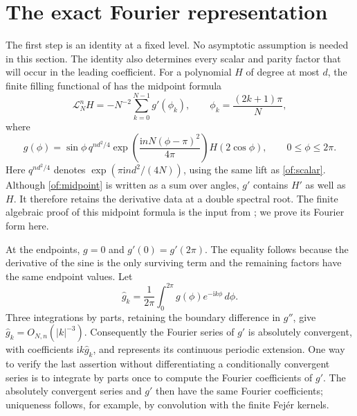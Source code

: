 \documentclass[11pt]{article}
\numberwithin{equation}{section}
\theoremstyle{definition}\newtheorem{definition}[theorem]{Definition}
\theoremstyle{remark}\newtheorem{remark}[theorem]{Remark}
\newcommand{\ii}{\mathrm i}
\begin{document}
\section{The exact Fourier representation}\label{of:fourier}

The first step is an identity at a fixed level. No asymptotic assumption
is needed in this section. The identity also determines every scalar
and parity factor that will occur in the leading coefficient. For a polynomial
$H$ of degree at most $d$, the finite filling functional of
\cite[Section 3]{FinitePaper} has the midpoint formula
\begin{equation}\label{of:midpoint}
 \mathcal L_N^nH=-N^{-2}\sum_{k=0}^{N-1}g'(\phi_k),\qquad
 \phi_k=\frac{(2k+1)\pi}{N},
\end{equation}
where
\[
 g(\phi)=\sin\phi\,q^{nd^2/4}
         \exp\left(\frac{\ii nN(\phi-\pi)^2}{4\pi}\right)
         H(2\cos\phi),\qquad 0\le\phi\le2\pi.
\]
Here $q^{nd^2/4}$ denotes
$\exp(\pi\ii nd^2/(4N))$, using the same lift as
\eqref{of:scalar}. Although \eqref{of:midpoint} is written as a
sum over angles, $g'$ contains $H'$ as well as $H$. It therefore
retains the derivative data at a double spectral root. The finite
algebraic proof of this midpoint formula is the input from
\cite{FinitePaper}; we prove its Fourier form here.

At the endpoints, $g=0$ and $g'(0)=g'(2\pi)$. The equality follows
because the derivative of the sine is the only surviving term and
the remaining factors have the same endpoint values. Let
\[
 \widehat g_k=\frac1{2\pi}\int_0^{2\pi}g(\phi)e^{-\ii k\phi}\,d\phi.
\]
Three integrations by parts, retaining the boundary difference in
$g''$, give $\widehat g_k=O_{N,n}(|k|^{-3})$. Consequently the Fourier
series of $g'$ is absolutely convergent, with coefficients
$\ii k\widehat g_k$, and represents its continuous periodic extension.
One way to verify the last assertion without differentiating a
conditionally convergent series is to integrate by parts once to
compute the Fourier coefficients of $g'$. The absolutely convergent
series and $g'$ then have the same Fourier coefficients; uniqueness
follows, for example, by convolution with the finite Fej\'er kernels.
\end{document}
